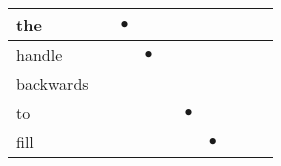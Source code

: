 \documentclass[landscape]{article}
\newcommand{\ssp}{\hspace{2pt}}
\newcommand{\mex}{\cellcolor{g}$\bullet$}
\begin{document}
\begin{tabular}{|l|p{10pt}|p{10pt}|p{10pt}|p{10pt}|p{10pt}|p{10pt}|p{10pt}|p{10pt}|p{10pt}|}
\hline
\ssp \cellcolor{ref1}the \ssp&\hspace{2pt}&\hspace{2pt}\mex&\hspace{2pt}&\hspace{2pt}&\hspace{2pt}&\hspace{2pt}&\hspace{2pt}&\hspace{2pt}&\hspace{2pt}\\
\hline
\ssp \cellcolor{ref2}handle \ssp&\hspace{2pt}&\hspace{2pt}&\hspace{2pt}\mex&\hspace{2pt}&\hspace{2pt}&\hspace{2pt}&\hspace{2pt}&\hspace{2pt}&\hspace{2pt}\\
\hline
\ssp backwards \ssp&\hspace{2pt}&\hspace{2pt}&\hspace{2pt}&\hspace{2pt}&\hspace{2pt}&\hspace{2pt}&\hspace{2pt}&\hspace{2pt}&\hspace{2pt}\\
\hline
\ssp \cellcolor{ref4}to \ssp&\hspace{2pt}&\hspace{2pt}&\hspace{2pt}&\hspace{2pt}&\hspace{2pt}\mex&\hspace{2pt}&\hspace{2pt}&\hspace{2pt}&\hspace{2pt}\\
\hline
\ssp \cellcolor{ref5}fill \ssp&\hspace{2pt}&\hspace{2pt}&\hspace{2pt}&\hspace{2pt}&\hspace{2pt}&\hspace{2pt}\mex&\hspace{2pt}&\hspace{2pt}&\hspace{2pt}\\

\end{tabular}
\end{document}
